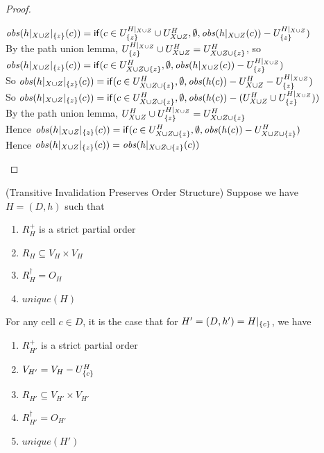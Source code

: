 \begin{proof}
\begin{tabbedproof}
\ooooo $\mathit{obs}(h|_{X \cup Z}|_{\{{z}\}}(c)) = \mathsf{if}({c \in U^{H|_{X \cup Z}}_{\{{z}\}} \cup U^H_{X \cup Z}}, {\emptyset}, {\mathit{obs}(h|_{X \cup Z}(c)) - U^{H|_{X \cup Z}}_{\{{z}\}}})$ \\
\ooooo By the path union lemma, $U^{H|_{X \cup Z}}_{\{{z}\}} \cup U^H_{X \cup Z} = U^H_{X \cup Z \cup \{{z}\}}$, so \\
\ooooox $\mathit{obs}(h|_{X \cup Z}|_{\{{z}\}}(c)) = \mathsf{if}({c \in U^H_{X \cup Z \cup \{{z}\}}}, {\emptyset}, {\mathit{obs}(h|_{X \cup Z}(c)) - U^{H|_{X \cup Z}}_{\{{z}\}}})$ \\
\ooooo So $\mathit{obs}(h|_{X \cup Z}|_{\{{z}\}}(c)) = \mathsf{if}({c \in U^H_{X \cup Z \cup \{{z}\}}}, {\emptyset}, {\mathit{obs}(h(c)) - U^H_{X \cup Z} - U^{H|_{X \cup Z}}_{\{{z}\}}})$ \\
\ooooo So $\mathit{obs}(h|_{X \cup Z}|_{\{{z}\}}(c)) = \mathsf{if}({c \in U^H_{X \cup Z \cup \{{z}\}}}, {\emptyset}, {\mathit{obs}(h(c)) - (U^H_{X \cup Z} \cup U^{H|_{X \cup Z}}_{\{{z}\}})})$ \\
\ooooo By the path union lemma, $U^H_{X \cup Z} \cup U^{H|_{X \cup Z}}_{\{{z}\}} = U^H_{X \cup Z \cup \{{z}\}}$ \\
\ooooo Hence $\mathit{obs}(h|_{X \cup Z}|_{\{{z}\}}(c)) = \mathsf{if}({c \in U^H_{X \cup Z \cup \{{z}\}}}, {\emptyset}, {\mathit{obs}(h(c)) - U^H_{X \cup Z \cup \{{z}\}}})$ \\
\ooooo Hence $\mathit{obs}(h|_{X \cup Z}|_{\{{z}\}}(c)) = \mathit{obs}(h|_{X \cup Z \cup \{{z}\}}(c))$
\end{tabbedproof}
\end{proof}

\begin{lemma}{(Transitive Invalidation Preserves Order Structure)}
Suppose we have $H = (D,h)$ such that 
\begin{enumerate}
\item $R^+_H$ is a strict partial order 
\item $R_H \subseteq V_H \times V_H$
\item $R^\dagger_H = O_H$ 
\item $\mathit{unique}(H)$
\end{enumerate}
\noindent For any cell $c \in D$, it is the case that for $H' = (D, h') = H|_{\{{c}\}}$, we have
\begin{enumerate}
\item $R^+_{H'}$ is a strict partial order 
\item $V_{H'} = V_H - U^H_{\{{c}\}}$
\item $R_{H'} \subseteq V_{H'} \times V_{H'}$
\item $R^\dagger_{H'} = O_{H'}$ 
\item $\mathit{unique}(H')$
\end{enumerate}
\end{lemma}

